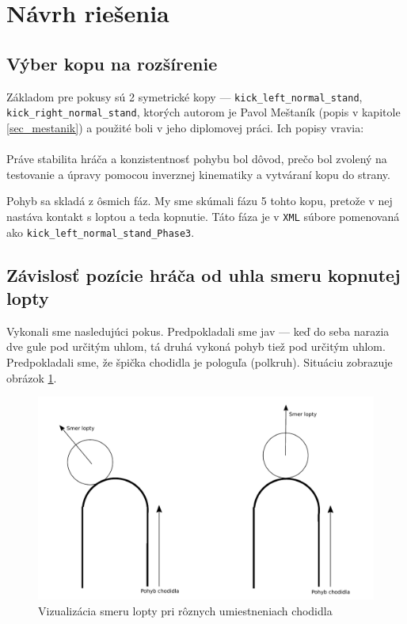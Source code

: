 \section{Návrh riešenia} \label{sec_solution}
\subsection{Výber kopu na rozšírenie} \label{sec_kick}
Základom pre pokusy sú 2 symetrické kopy --- \texttt{kick\_left\_normal\_stand}, \texttt{kick\_right\_normal\_stand}, ktorých autorom je Pavol Meštaník (popis v kapitole \ref{sec_mestanik}) a použité boli v jeho diplomovej práci.
Ich popisy vravia:\\

\textit{}
\\

Práve stabilita hráča a konzistentnosť pohybu bol dôvod, prečo bol zvolený na testovanie a úpravy pomocou inverznej kinematiky a vytváraní kopu do strany. 


Pohyb sa skladá z ôsmich fáz. My sme skúmali fázu 5 tohto kopu, pretože v nej nastáva kontakt s loptou a teda kopnutie. Táto fáza je v \texttt{XML} súbore pomenovaná ako \texttt{kick\_left\_normal\_stand\_Phase3}.


\subsection{Závislosť pozície hráča od uhla smeru kopnutej lopty} \label{sec_foot_biliard}
Vykonali sme nasledujúci pokus. Predpokladali sme jav  --- keď do seba narazia dve gule pod určitým uhlom, tá druhá vykoná pohyb tiež pod určitým uhlom. Predpokladali sme, že špička chodidla je pologuľa (polkruh). Situáciu zobrazuje obrázok \ref{pic_foot_biliard}.
\begin{figure}[H]
  \center
  \includegraphics[scale=.5]{./data/foot_biliard}
  \caption{Vizualizácia smeru lopty pri rôznych umiestneniach chodidla}
  \label{pic_foot_biliard}
\end{figure}

